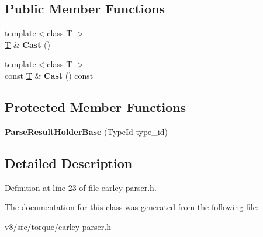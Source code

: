 \subsection*{Public Member Functions}
\begin{DoxyCompactItemize}
\item 
\mbox{\label{classv8_1_1internal_1_1torque_1_1ParseResultHolderBase_a369e42bc42f04bc65894ba55d34ac334}} 
{\footnotesize template$<$class T $>$ }\\\mbox{\hyperlink{classv8_1_1internal_1_1torque_1_1T}{T}} \& {\bfseries Cast} ()
\item 
\mbox{\label{classv8_1_1internal_1_1torque_1_1ParseResultHolderBase_ac03a29ad63345b62599e6ed1d33bc7c4}} 
{\footnotesize template$<$class T $>$ }\\const \mbox{\hyperlink{classv8_1_1internal_1_1torque_1_1T}{T}} \& {\bfseries Cast} () const
\end{DoxyCompactItemize}
\subsection*{Protected Member Functions}
\begin{DoxyCompactItemize}
\item 
\mbox{\label{classv8_1_1internal_1_1torque_1_1ParseResultHolderBase_aad528131025a77ce4ee69835b9d66c1a}} 
{\bfseries Parse\+Result\+Holder\+Base} (Type\+Id type\+\_\+id)
\end{DoxyCompactItemize}


\subsection{Detailed Description}


Definition at line 23 of file earley-\/parser.\+h.



The documentation for this class was generated from the following file\+:\begin{DoxyCompactItemize}
\item 
v8/src/torque/earley-\/parser.\+h\end{DoxyCompactItemize}
